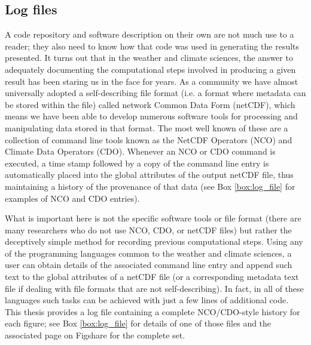 \subsection{Log files}\label{s:log_files}

A code repository and software description on their own are not much use to a reader; they also need to know how that code was used in generating the results presented. It turns out that in the weather and climate sciences, the answer to adequately documenting the computational steps involved in producing a given result has been staring us in the face for years. As a community we have almost universally adopted a self-describing file format (i.e. a format where metadata can be stored within the file) called network Common Data Form (netCDF), which means we have been able to develop numerous software tools for processing and manipulating data stored in that format. The most well known of these are a collection of command line tools known as the NetCDF Operators (NCO) and Climate Data Operators (CDO). Whenever an NCO or CDO command is executed, a time stamp followed by a copy of the command line entry is automatically placed into the global attributes of the output netCDF file, thus maintaining a history of the provenance of that data (see Box \ref{box:log_file} for examples of NCO and CDO entries).

What is important here is not the specific software tools or file format (there are many researchers who do not use NCO, CDO, or netCDF files) but rather the deceptively simple method for recording previous computational steps. Using any of the programming languages common to the weather and climate sciences, a user can obtain details of the associated command line entry and append such text to the global attributes of a netCDF file (or a corresponding metadata text file if dealing with file formats that are not self-describing). In fact, in all of these languages such tasks can be achieved with just a few lines of additional code. This thesis provides a log file containing a complete NCO/CDO-style history for each figure; see Box \ref{box:log_file} for details of one of those files and the associated page on Figshare \citep{IrvingFigshare2016} for the complete set.

